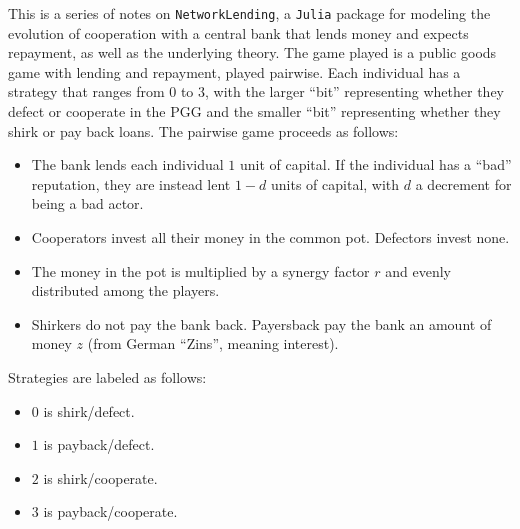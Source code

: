 \documentclass[13pt]{amsart}
\begin{document}
This is a series of notes on \texttt{NetworkLending}, a \texttt{Julia} package for modeling the evolution of cooperation with a central bank that lends money and expects repayment, as well as the underlying theory.
The game played is a public goods game with lending and repayment, played pairwise.
Each individual has a strategy that ranges from $0$ to $3$, with the larger ``bit'' representing whether they defect or cooperate in the PGG and the smaller ``bit'' representing whether they shirk or pay back loans.
The pairwise game proceeds as follows:
\begin{itemize}
    \item The bank lends each individual $1$ unit of capital.
    If the individual has a ``bad'' reputation, they are instead lent $1-d$ units of capital, with $d$ a decrement for being a bad actor.
    \item Cooperators invest all their money in the common pot.
    Defectors invest none.
    \item The money in the pot is multiplied by a synergy factor $r$ and evenly distributed among the players.
    \item Shirkers do not pay the bank back.
    Payersback pay the bank an amount of money $z$ (from German ``Zins'', meaning interest).
\end{itemize}
Strategies are labeled as follows:
\begin{itemize}
    \item $0$ is shirk/defect.
    \item $1$ is payback/defect.
    \item $2$ is shirk/cooperate.
    \item $3$ is payback/cooperate.
\end{itemize}
\end{document}
